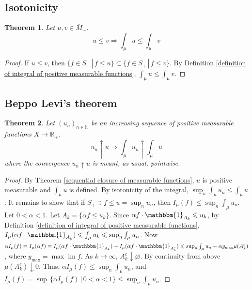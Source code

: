 \documentclass[11pt, a4paper, openany]{book}
\newtheorem{thm}{Theorem}\newtheorem{lem}{Lemma}\newtheorem{crl}{Corollary}
\theoremstyle{definition}
\DeclareMathOperator{\im}{im}
\newcommand{\er}{\overline{\mathbb{R}}}
\begin{document}
\subsection{Isotonicity}
    \begin{thm}\label{monotonicity of integral of positive measurable functions}
        Let $u,v\in\overline{M}_+$.
        \[
            u\leqslant v\Longrightarrow \int_\mu u\leqslant \int_\mu v
        \]
    \end{thm}
    \begin{proof}
        If $u\leqslant v$, then $\{f\in S_+\,|\,f\leqslant u\}\subset \{f\in S_+\,|\,f\leqslant v\}$. By Definition \ref{definition of integral of positive measurable functions}, $\int_\mu u\leqslant \int_\mu v$.
    \end{proof}
\subsection{Beppo Levi's theorem}
    \begin{thm}\label{Beppo Levi's Theorem}
        Let $(u_n)_{n\in\mathbb{N}}$ be an increasing sequence of positive measurable functions $X\rightarrow \er_+$.
        \[
            u_n\uparrow u\Longrightarrow \int_\mu u_n\uparrow \int_\mu u
        \]
        where the convergence $u_n\uparrow u$ is meant, as usual, pointwise.
    \end{thm}
    \begin{proof}
        By Theorem \ref{sequential closure of measurable functions}, $u$ is positive measurable and $\int_\mu u$ is defined. By isotonicity of the integral, $\sup_{n}\int_\mu u_n\leqslant \int_\mu u$. It remains to show that if $S_+ \ni f\leqslant u=\sup_{n}u_n$, then $I_\mu(f)\leqslant \sup_{n}\int_\mu u_n$. Let $0<\alpha<1$. Let $A_k=\{\alpha f\leqslant u_k\}$. Since $\alpha f\cdot \mathbbm{1}_{A_k}\leqslant u_k$, by Definition \ref{definition of integral of positive measurable functions}, $I_\mu(\alpha f\cdot \mathbbm{1}_{A_k})\leqslant \int_\mu u_k \leqslant  \sup_{n}\int_\mu u_n$. Now $\alpha I_\mu(f)=I_\mu(\alpha f)=I_\mu(\alpha f\cdot \mathbbm{1}_{A_k})+I_\mu(\alpha f\cdot \mathbbm{1}_{A_k^c})\leqslant \sup_{n}\int_\mu u_n+\alpha y_{\text{max}}\mu(A_k^c)$, where $y_\text{max}=\max\im f$. As $k\to \infty$, $A_k^c\downarrow \varnothing$. %
        By continuity from above $\mu(A_k^c)\downarrow 0$. Thus, $\alpha I_\mu(f)\leqslant \sup_{n}\int_\mu u_n$, and $I_\mu(f)=\sup\,\{\alpha I_\mu(f)\,|\,0<\alpha<1\}\leqslant \sup_{n}\int_\mu u_n$.
    \end{proof}
\end{document}
